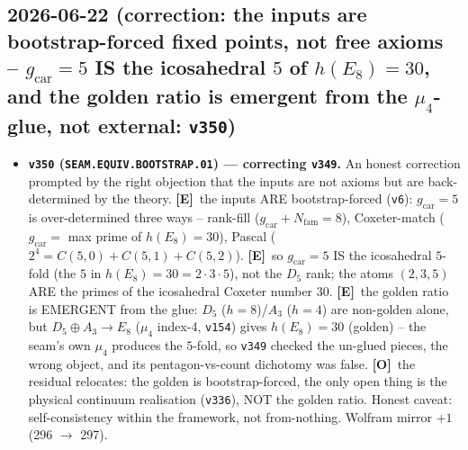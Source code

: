\documentclass[11pt]{article}
\providecommand{\mE}{\textbf{[E]}}\providecommand{\mC}{\textbf{[C]}}
\providecommand{\mO}{\textbf{[O]}}\providecommand{\mX}{\textbf{[X]}}
\providecommand{\vref}[1]{\texttt{#1}}
\providecommand{\gcar}{g_{\mathrm{car}}}\providecommand{\Nfam}{N_{\mathrm{fam}}}
\begin{document}
\subsection*{2026-06-22 (correction: the inputs are bootstrap-forced fixed points, not free axioms -- $g_{\mathrm{car}}{=}5$ IS the icosahedral $5$ of $h(E_8){=}30$, and the golden ratio is emergent from the $\mu_4$-glue, not external: \texttt{v350})}
\begin{itemize}
\item \textbf{\texttt{v350} (\texttt{SEAM.EQUIV.BOOTSTRAP.01}) --- correcting \vref{v349}.} An honest correction
prompted by the right objection that the inputs are not axioms but are back-determined by the theory. \mE\ the
inputs ARE bootstrap-forced (\vref{v6}): $\gcar{=}5$ is over-determined three ways -- rank-fill ($\gcar{+}\Nfam{=}8$),
Coxeter-match ($\gcar{=}$ max prime of $h(E_8){=}30$), Pascal ($2^4{=}C(5,0){+}C(5,1){+}C(5,2)$). \mE\ so
$\gcar{=}5$ IS the icosahedral $5$-fold (the $5$ in $h(E_8){=}30{=}2{\cdot}3{\cdot}5$), not the $D_5$ rank; the atoms
$(2,3,5)$ ARE the primes of the icosahedral Coxeter number $30$. \mE\ the golden ratio is EMERGENT from the glue:
$D_5$ ($h{=}8$)/$A_3$ ($h{=}4$) are non-golden alone, but $D_5\!\oplus\!A_3\to E_8$ ($\mu_4$ index-4, \vref{v154})
gives $h(E_8){=}30$ (golden) -- the seam's own $\mu_4$ produces the $5$-fold, so \vref{v349} checked the un-glued
pieces, the wrong object, and its pentagon-vs-count dichotomy was false. \mO\ the residual relocates: the golden is
bootstrap-forced, the only open thing is the physical continuum realisation (\vref{v336}), NOT the golden ratio.
Honest caveat: self-consistency within the framework, not from-nothing. Wolfram mirror $+1$ (296 $\to$ 297).
\end{itemize}
\end{document}
